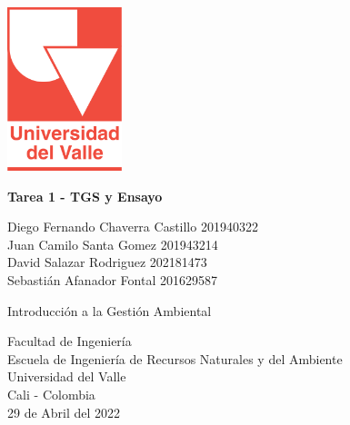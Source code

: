 \begin{titlepage}
    \begin{center}
        \vspace*{1cm}


        \includegraphics[width=0.25\textwidth]{img/universidadDelValle.png}
        
        \vspace{1.5cm}
        \textbf{Tarea 1 - TGS y Ensayo}\\
        \vspace{1.5cm}

        Diego Fernando Chaverra Castillo 201940322\\
        Juan Camilo Santa Gomez 201943214\\
        David Salazar Rodriguez 202181473\\
        Sebastián Afanador Fontal 201629587\\
        

        \vfill

        Introducción a la Gestión Ambiental
        
        \vfill
        
        
        Facultad de Ingeniería\\
        Escuela de Ingeniería de Recursos Naturales y del Ambiente\\
        Universidad del Valle\\
        Cali - Colombia\\
        \vspace{0.8cm}
        29 de Abril del 2022

    \end{center}
\end{titlepage}